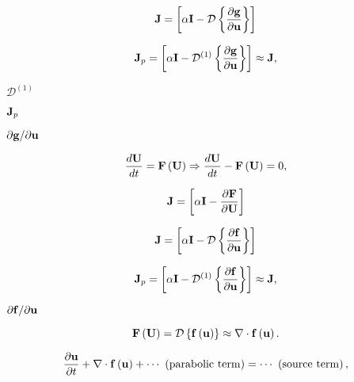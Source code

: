 \documentclass{article}
\begin{document}
\begin{equation} {\bf J} = \left[\alpha{\bf I} - \mathcal{D}\left\{\frac {\partial {\bf g}} {\partial {\bf u}}\right\} \right] \end{equation}
\pagebreak

\begin{equation} {\bf J}_p = \left[\alpha{\bf I} - \mathcal{D}^{\left(1\right)}\left\{\frac {\partial {\bf g}} {\partial {\bf u}}\right\} \right] \approx {\bf J}, \end{equation}
\pagebreak

$\mathcal{D}^{\left(1\right)}$
\pagebreak

${\bf J}_p$
\pagebreak

$\partial {\bf g}/ \partial {\bf u}$
\pagebreak

\begin{equation} \frac {d{\bf U}}{dt} = {\bf F}\left({\bf U}\right) \Rightarrow \frac {d{\bf U}}{dt} - {\bf F}\left({\bf U}\right) = 0, \end{equation}
\pagebreak

\begin{equation} {\bf J} = \left[\alpha{\bf I} - \frac {\partial {\bf F}} {\partial {\bf U}} \right] \end{equation}
\pagebreak

\begin{equation} {\bf J} = \left[\alpha{\bf I} - \mathcal{D}\left\{\frac {\partial {\bf f}} {\partial {\bf u}}\right\} \right] \end{equation}
\pagebreak

\begin{equation} {\bf J}_p = \left[\alpha{\bf I} - \mathcal{D}^{\left(1\right)}\left\{\frac {\partial {\bf f}} {\partial {\bf u}}\right\} \right] \approx {\bf J}, \end{equation}
\pagebreak

$\partial {\bf f}/ \partial {\bf u}$
\pagebreak

\begin{equation} {\bf F}\left({\bf U}\right) = \mathcal{D}\left\{{\bf f}\left({\bf u}\right)\right\} \approx \nabla \cdot {\bf f}\left({\bf u}\right). \end{equation}
\pagebreak

\begin{equation} \frac {\partial {\bf u}} {\partial t} + \nabla \cdot {\bf f}\left({\bf u}\right) + \cdots\ \left({\rm parabolic\ term}\right) = \cdots\ \left({\rm source\ term}\right), \end{equation}
\pagebreak
\end{document}
